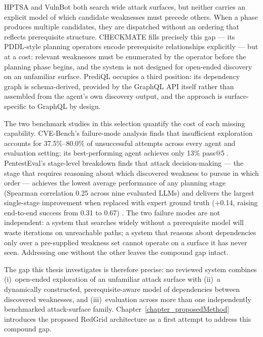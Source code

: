 HPTSA and VulnBot both search wide attack surfaces, but neither carries an explicit model of which candidate weaknesses must precede others. When a phase produces multiple candidates, they are dispatched without an ordering that reflects prerequisite structure. CHECKMATE fills precisely this gap --- its PDDL-style planning operators encode prerequisite relationships explicitly --- but at a cost: relevant weaknesses must be enumerated by the operator before the planning phase begins, and the system is not designed for open-ended discovery on an unfamiliar surface. PrediQL occupies a third position: its dependency graph is schema-derived, provided by the GraphQL API itself rather than assembled from the agent's own discovery output, and the approach is surface-specific to GraphQL by design.

The two benchmark studies in this selection quantify the cost of each missing capability. CVE-Bench's failure-mode analysis finds that insufficient exploration accounts for 37.5\%--80.0\% of unsuccessful attempts across every agent and evaluation setting; its best-performing agent achieves only 13\% pass@5 \citep{zhu2025cvebench}. PentestEval's stage-level breakdown finds that attack decision-making --- the stage that requires reasoning about which discovered weakness to pursue in which order --- achieves the lowest average performance of any planning stage (Spearman correlation 0.25 across nine evaluated LLMs) and delivers the largest single-stage improvement when replaced with expert ground truth (+0.14, raising end-to-end success from 0.31 to 0.67) \citep{yang2025pentesteval}. The two failure modes are not independent: a system that searches widely without a prerequisite model will waste iterations on unreachable paths; a system that reasons about dependencies only over a pre-supplied weakness set cannot operate on a surface it has never seen. Addressing one without the other leaves the compound gap intact.

The gap this thesis investigates is therefore precise: no reviewed system combines (i)~open-ended exploration of an unfamiliar attack surface with (ii)~a dynamically constructed, prerequisite-aware model of dependencies between discovered weaknesses, and (iii)~evaluation across more than one independently benchmarked attack-surface family. Chapter~\ref{chapter_proposedMethod} introduces the proposed RedGrid architecture as a first attempt to address this compound gap.
